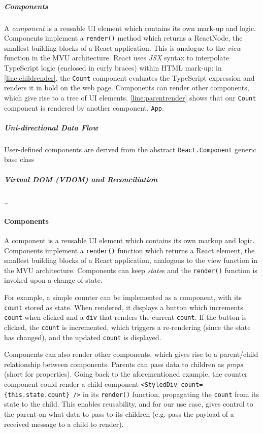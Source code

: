 \subparagraph{Components}
A \textit{component} is a reusable UI element which
contains its own mark-up and logic.
Components implement a \texttt{render()} method which returns
a ReactNode, the smallest building blocks of a React application.
This is analogue to the \textit{view} function in the MVU architecture.
React uses \textit{JSX} syntax to interpolate TypeScript logic 
(enclosed in curly braces)
within HTML mark-up: 
in \cref{line:childrender}, the \texttt{Count} component
evaluates the TypeScript expression 
 and renders it in bold on the web page.
Components can render other components, which give rise to
a tree of UI elements. \cref{line:parentrender} shows that our
\texttt{Count} component is rendered by 
another component, \texttt{App}.

\subparagraph{Uni-directional Data Flow}
User-defined components are derived from the abstract
\texttt{React.Component} generic base class

\subparagraph{Virtual DOM (VDOM) and Reconciliation}
\dots

\paragraph{Components}
A component is a reusable UI element which
contains its own markup and logic.
Components implement a \texttt{render()} function which returns a React
element, the smallest building blocks of a React application, analogous to the
view function in the MVU architecture.
Components can keep \textit{state}s and the \texttt{render()} function is
invoked upon a change of state.

For example, a simple counter can be implemented as a component,
with its \texttt{count} stored as state.
When rendered, it displays a button which increments \texttt{count}
when clicked and a \texttt{div} that renders the current
\texttt{count}.
If the button is clicked, the \texttt{count} is incremented, which triggers a
re-rendering (since the state has changed), and the updated \texttt{count} is
displayed.

Components can also render other components, which gives rise
to a parent/child relationship between components.
Parents can pass data to children as \textit{props} (short for properties).
Going back to the aforementioned example, the counter component could
render a child component \texttt{<StyledDiv count=\{this.state.count\} />} in
its \texttt{render()} function, propagating the \texttt{count} from its state
to the child.
This enables reusability, and for our use case, gives control to the parent
on what data to pass to its children (e.g. pass the payload of a received
message to a child to render).



